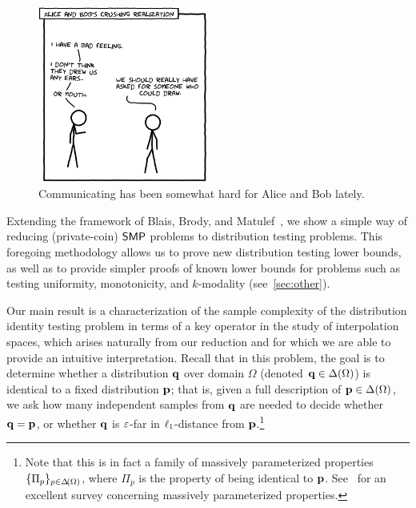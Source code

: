 \begin{figure}[ht]\centering
  \includegraphics[width=0.5\textwidth]{chapter2/fig-alicebob}
  \caption{Communicating has been somewhat hard for Alice and Bob lately.}
\end{figure}

Extending the framework of Blais, Brody, and Matulef~\cite{BBM:12}, we show a simple way of reducing (private-coin) $\SMP$ problems to distribution testing problems. This foregoing methodology allows us to prove new distribution testing lower bounds, as well as to provide simpler proofs of known lower bounds for problems such as testing uniformity, monotonicity, and $k$-modality (see~\cref{sec:other}). 

Our main result is a characterization of the sample complexity of the distribution identity testing problem in terms of a key operator in the study of interpolation spaces, which arises naturally from our reduction and for which we are able to provide an intuitive interpretation. Recall that in this problem, the goal is to determine whether a distribution $\q$ over domain $\Omega$ (denoted $\q\in\distribs{\Omega}$) is identical to a fixed distribution $\p$; that is, given a full description of $\p\in\distribs{\Omega}$, we ask how many independent samples from $\q$ are needed to decide whether $\q=\p$, or whether $\q$ is $\eps$-far in $\lp[1]$-distance from $\p$.\footnote{Note that this is in fact a family of massively parameterized properties $\{\Pi_p\}_{p\in\distribs{\Omega}}$, where $\Pi_p$ is the property of being identical to $\p$. See~\cite{Newman:10} for an excellent survey concerning massively parameterized properties.}

